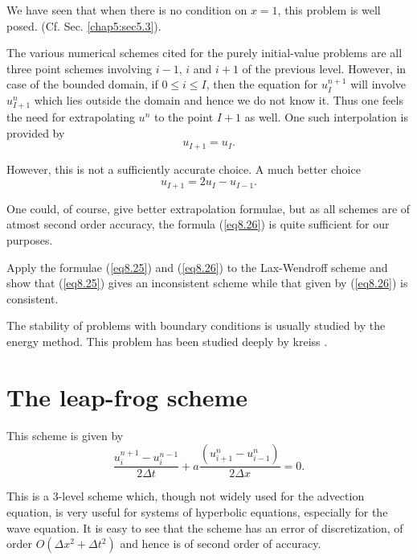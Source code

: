 We have seen that when there is no condition on $x=1$, this problem is well posed. (Cf. Sec. \ref{chap5:sec5.3}).

The various numerical schemes cited for the purely initial-value
problems are all three point schemes involving $i-1$, $i$ and $i+1$ of
the previous level. However, in case of the bounded domain, if $0 \leq
i  \leq I$, then the equation for $u^{n+1}_I$ will involve $u^n_{I+1}$
which lies outside the domain and hence we do not know it. Thus one
feels the need for extrapolating $u^n$ to the point $I+1$ as well. One
such interpolation is provided by  
\begin{equation*}
u_{I+1} = u_I.\tag{8.25}\label{eq8.25}
\end{equation*}

However, this is not a sufficiently accurate choice. A much better choice 
\begin{equation*}
u_{I+1} = 2u_I - u_{I-1}.\tag{8.26}\label{eq8.26}
\end{equation*}\pageoriginale

One could, of course, give better extrapolation formulae, but as all schemes are of atmost second order accuracy, the formula (\ref{eq8.26}) is quite sufficient for our purposes.

\begin{exercise}\label{chap8:exer8.4}
Apply the formulae (\ref{eq8.25}) and (\ref{eq8.26}) to the Lax-Wendroff scheme and show that (\ref{eq8.25}) gives an inconsistent scheme while that given by (\ref{eq8.26}) is consistent.
\end{exercise}

\begin{remark}\label{chap8:rem8.5}
The stability of problems with boundary conditions is usually studied by the energy method. This problem has been studied deeply by kreiss \cite{key19}.
\end{remark}

\section{The leap-frog scheme}\label{chap8:sec8.7}
This scheme is given by
\begin{equation*}
\frac{u^{n+1}_i - u^{n-1}_i}{2\Delta t}  + a \frac{(u^n_{i+1} - u^n_{i-1})}{2\Delta x} = 0. \tag{8.27} \label{eq8.27}
\end{equation*}

This is a 3-level scheme which, though not widely used for the advection equation, is very useful for systems of hyperbolic equations, especially for the wave equation. It is easy to see that the scheme has an error of discretization, of order $O(\Delta x^2 + \Delta t^2)$ and hence is of second order of accuracy.

